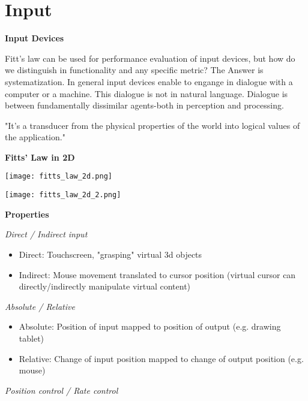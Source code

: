 \section{Input}

\textbf{Input Devices}

Fitt's law can be used for performance evaluation of input devices, but how do we distinguish in functionality and any specific metric? The Answer is systematization. 
In general input devices enable to engange in dialogue with a computer or a machine. This dialogue is not in natural language. 
Dialogue is between fundamentally dissimilar agents-both in perception and processing. \medskip

"It's a transducer from the physical properties of the world into logical values of the application." \medskip

\textbf{Fitts' Law in 2D}

\begin{center}
	\texttt{[image: fitts\_law\_2d.png]}
\end{center}

\begin{center}
	\texttt{[image: fitts\_law\_2d\_2.png]}
\end{center}

\textbf{Properties} \smallskip

\textit{Direct / Indirect input} \smallskip

\begin{itemize}[itemsep=-5pt, topsep=0pt, leftmargin=*]
	\item Direct: Touchscreen, "grasping" virtual 3d objects
	\item Indirect: Mouse movement translated to cursor position (virtual cursor can directly/indirectly manipulate virtual content)
\end{itemize}

\columnbreak

\textit{Absolute / Relative} \smallskip

\begin{itemize}[itemsep=-5pt, topsep=0pt, leftmargin=*]
	\item Absolute: Position of input mapped to position of output (e.g. drawing tablet)
	\item Relative: Change of input position mapped to change of output position (e.g. mouse)
\end{itemize}


\textit{Position control / Rate control} \smallskip


